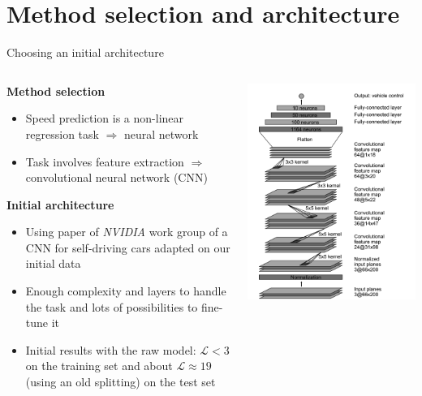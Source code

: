 \section{Method selection and architecture}

\begin{frame}{Choosing an initial architecture}
	\begin{columns}[c]
		\begin{column}{0.55\textwidth}
			\textbf{Method selection}
			\begin{itemize}
				\item<+-> Speed prediction is a non-linear regression task $\Rightarrow$ neural network
				\item<+-> Task involves feature extraction $\Rightarrow$ convolutional neural network (CNN)
			\end{itemize}
			\textbf{Initial architecture}
			\begin{itemize}
				\item<+-> Using paper of \textit{NVIDIA} work group \cite{NVIDIA2016} of a CNN for self-driving cars adapted on our initial data
				\item<+-> Enough complexity and layers to handle the task and lots of possibilities to fine-tune it
				\item<+-> Initial results with the raw model: $\mathcal{L} < 3$ on the training set and about $\mathcal{L} \approx 19$ (using an old splitting) 
				on the test set
			\end{itemize}
		\end{column}
		\begin{column}{0.4\textwidth}
			\includegraphics[width=\textwidth]{./imgs/NetworkOriginal.png}

\end{column}
\end{columns}
\end{frame}
